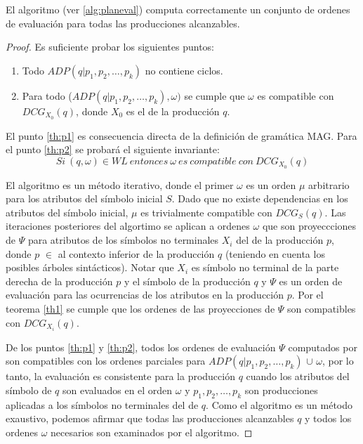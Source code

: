 \begin{theorem}
\label{th2}
El algoritmo  (ver \ref{alg:planeval}) computa correctamente un conjunto de ordenes de evaluación para todas las producciones alcanzables.
\end{theorem}

\begin{proof}
Es suficiente probar los siguientes puntos:
\begin{enumerate}
    \item \label{th:p1}Todo $ADP (q | p_{1}, p_{2}, \dots, p_{k})$ no contiene ciclos.

    \item \label{th:p2}Para todo ($ADP (q | p_{1}, p_{2}, \dots, p_{k}), \omega)$ se cumple que $\omega$ es compatible con $DCG_{X_{0}}(q)$,  donde $X_{0}$ es el  de la producción $q$.
\end{enumerate}

El punto \ref{th:p1} es consecuencia directa de la definición de gramática MAG. Para el punto \ref{th:p2} se probará el siguiente invariante:
$$
Si\ (q,\omega)\in WL\ entonces\ \omega\ es\ compatible\ con\ DCG_{X_{0}}(q)
$$

El algoritmo  es un método iterativo, donde el primer $\omega$ es un orden $\mu$ arbitrario para los atributos del símbolo inicial $S$. Dado que no existe dependencias en los atributos del símbolo inicial, $\mu$ es trivialmente compatible con $DCG_{S}(q)$. Las iteraciones posteriores del algortimo  se aplican a ordenes $\omega$ que son proyeccciones de $\Psi$ para atributos de los símbolos no terminales $X_{i}$ del  de la producción $p$, donde $p$ $\in$ al contexto inferior de la producción $q$ (teniendo en cuenta los posibles árboles sintácticos). Notar que $X_{i}$ es símbolo no terminal de la parte derecha de la producción $p$ y el símbolo  de la producción $q$ y $\Psi$ es un orden de evaluación para las ocurrencias de los atributos en la producción $p$. Por el teorema \ref{th1} se cumple que los ordenes de las proyecciones de $\Psi$ son compatibles con $DCG_{X_{i}}(q)$.

De los puntos \ref{th:p1} y \ref{th:p2}, todos los ordenes de evaluación $\Psi$ computados por  son compatibles con los ordenes parciales para $ADP (q | p_{1}, p_{2}, \dots, p_{k})$ $\cup$ $\omega$, por lo tanto, la evaluación es consistente para la producción $q$ cuando los atributos del símbolo  de $q$ son evaluados en el orden $\omega$ y $p_{1}, p_{2}, \dots, p_{k}$ son producciones aplicadas a los símbolos no terminales del  de $q$. Como el algoritmo es un método exaustivo, podemos afirmar que todas las producciones alcanzables $q$ y todos los ordenes $\omega$ necesarios son examinados por el algoritmo.

\end{proof}

